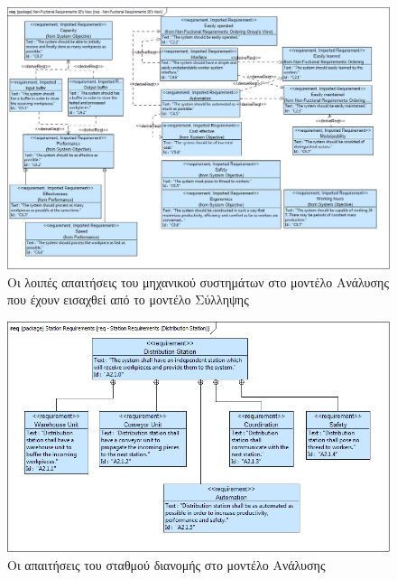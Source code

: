 \documentclass[a4paper,12pt,twoside]{report}
\begin{document}
{\begin{appendices}
			\begin{figure}[hp]
					\centering
					\includegraphics[scale=0.30]{AnalysisModel_req-Non-FuctionalRequirementsSEsView.png}
					\caption{Οι λοιπές απαιτήσεις του μηχανικού συστημάτων στο μοντέλο Ανάλυσης που έχουν εισαχθεί από το μοντέλο Σύλληψης}
					\label{φωτ:Οι λοιπές απαιτήσεις του μηχανικού συστημάτων στο μοντέλο Ανάλυσης που έχουν εισαχθεί από το μοντέλο Σύλληψης}
			\end{figure}
			
			\begin{figure}[hp]
					\centering
					\includegraphics[scale=0.30]{AnalysisModel_req-StationRequirements(DistributionStation).png}
					\caption{Οι απαιτήσεις του σταθμού διανομής στο μοντέλο Ανάλυσης}
					\label{φωτ:Οι απαιτήσεις του σταθμού διανομής στο μοντέλο Ανάλυσης}
			\end{figure}
			

\end{appendices}}
\end{document}
